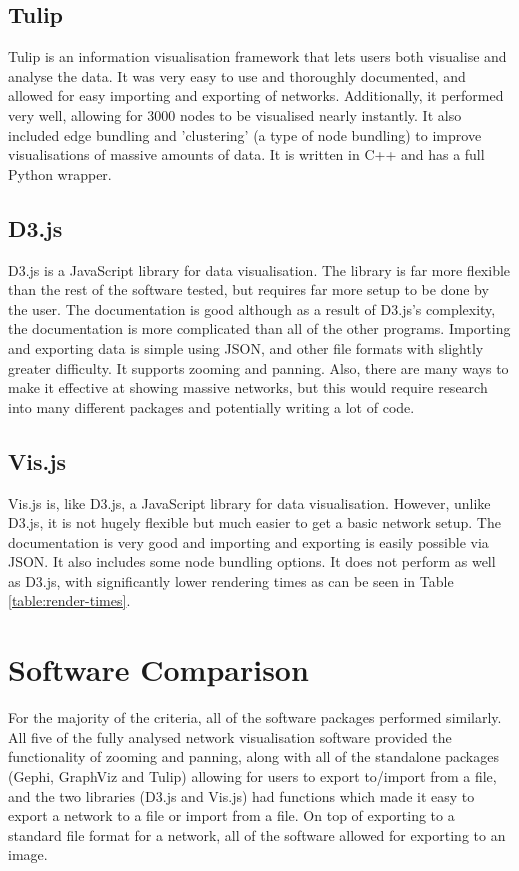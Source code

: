 \documentclass[../dissertation.tex]{subfiles}
\begin{document}
\subsection{Tulip}

Tulip is an information visualisation framework that lets users both visualise and analyse the data. It was very easy to use and thoroughly documented, and allowed for easy importing and exporting of networks. Additionally, it performed very well, allowing for 3000 nodes to be visualised nearly instantly. It also included edge bundling and 'clustering' (a type of node bundling) to improve visualisations of massive amounts of data. It is written in C++ and has a full Python wrapper.

\subsection{D3.js}

D3.js is a JavaScript library for data visualisation. The library is far more flexible than the rest of the software tested, but requires far more setup to be done by the user. The documentation is good although as a result of D3.js's complexity, the documentation is more complicated than all of the other programs. Importing and exporting data is simple using JSON, and other file formats with slightly greater difficulty. It supports zooming and panning. Also, there are many ways to make it effective at showing massive networks, but this would require research into many different packages and potentially writing a lot of code.

\subsection{Vis.js}

Vis.js is, like D3.js, a JavaScript library for data visualisation. However, unlike D3.js, it is not hugely flexible but much easier to get a basic network setup. The documentation is very good and importing and exporting is easily possible via JSON. It also includes some node bundling options. It does not perform as well as D3.js, with significantly lower rendering times as can be seen in Table \ref{table:render-times}.

\section{Software Comparison}

For the majority of the criteria, all of the software packages performed similarly. All five of the fully analysed network visualisation software provided the functionality of zooming and panning, along with all of the standalone packages (Gephi, GraphViz and Tulip) allowing for users to export to/import from a file, and the two libraries (D3.js and Vis.js) had functions which made it easy to export a network to a file or import from a file. On top of exporting to a standard file format for a network, all of the software allowed for exporting to an image.
\end{document}
